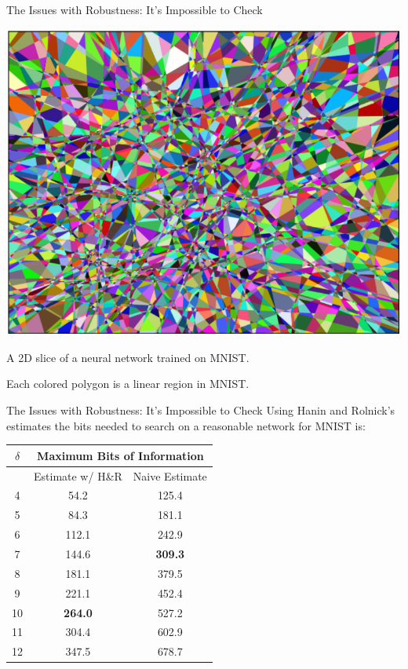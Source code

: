 \documentclass{beamer}
\begin{document}
\begin{frame}{The Issues with Robustness: It's Impossible to Check}
    \begin{center}
        \includegraphics[scale=0.23]{image_of_2d_regions_in_mnist.png}

        A 2D slice of a neural network trained on MNIST. 
        
        Each colored polygon is a linear region in MNIST. \cite{estimate_of_linear_regions}
    \end{center}
\end{frame}

\begin{frame}{The Issues with Robustness: It's Impossible to Check}
    Using Hanin and Rolnick's estimates the bits needed to search on a reasonable network for MNIST is:
    \begin{center}
        \begin{tabular}{| c || c | c |}
            \hline
            $\delta$ & \multicolumn{2}{|c|}{Maximum Bits of Information} \\
            \hline
            & Estimate w/ H\&R & Naive Estimate \\
            \hline
                4 & 54.2 & 125.4 \\
                5 & 84.3 & 181.1 \\
                6 & 112.1 & 242.9 \\
                7 & 144.6 & \textbf{309.3} \\
                8 & 181.1 & 379.5 \\
                9 & 221.1 & 452.4 \\
                10 & \textbf{264.0} & 527.2 \\
                11 & 304.4 & 602.9 \\
                12 & 347.5 & 678.7 \\
            \hline
        \end{tabular}
        \vspace{10pt}
    \end{center}
\end{frame}
\end{document}
